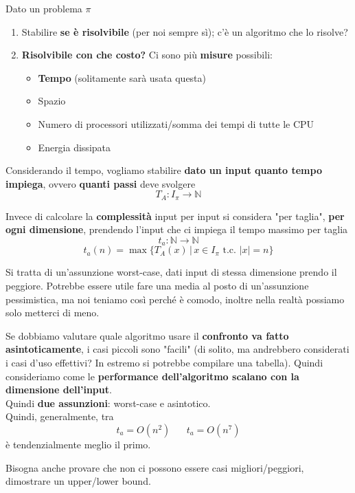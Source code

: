 Dato un problema $\pi$
\begin{enumerate}
	\item Stabilire \textbf{se è risolvibile} (per noi sempre sì); c'è un algoritmo che lo risolve?
	
	\item \textbf{Risolvibile con che costo?} Ci sono più \textbf{misure} possibili:
	\begin{itemize}
		\item \textbf{Tempo} (solitamente sarà usata questa)
		\item Spazio
		\item Numero di processori utilizzati/somma dei tempi di tutte le CPU
		\item Energia dissipata
	\end{itemize}
\end{enumerate}

Considerando il tempo, vogliamo stabilire \textbf{dato un input quanto tempo impiega}, ovvero \textbf{quanti passi} deve svolgere
$$ T_A : I_\pi \rightarrow \mathbb{N}$$

Invece di calcolare la \textbf{complessità} input per input si considera "per taglia", \textbf{per ogni dimensione}, prendendo l'input che ci impiega il tempo massimo per taglia
$$ t_a : \mathbb{N} \rightarrow \mathbb{N}$$
$$ t_a (n) = \max \{T_A (x) \, | \, x \in I_\pi \text{ t.c. } |x| = n\} $$

Si tratta di un'assunzione worst-case, dati input di stessa dimensione prendo il peggiore. Potrebbe essere utile fare una media al posto di un'assunzione pessimistica, ma noi teniamo così perché è comodo, inoltre nella realtà possiamo solo metterci di meno.\\

\newpage

Se dobbiamo valutare quale algoritmo usare il \textbf{confronto va fatto asintoticamente}, i casi piccoli sono "facili" (di solito, ma andrebbero considerati i casi d'uso effettivi? In estremo si potrebbe compilare una tabella). Quindi consideriamo come le \textbf{performance dell'algoritmo scalano con la dimensione dell'input}.\\

Quindi \textbf{due assunzioni}: worst-case e asintotico. \\

Quindi, generalmente, tra
$$ t_a = O (n^2) \;\;\;\;\;\; t_a = O(n^7)$$
è tendenzialmente meglio il primo.

Bisogna anche provare che non ci possono essere casi migliori/peggiori, dimostrare un upper/lower bound.\\

